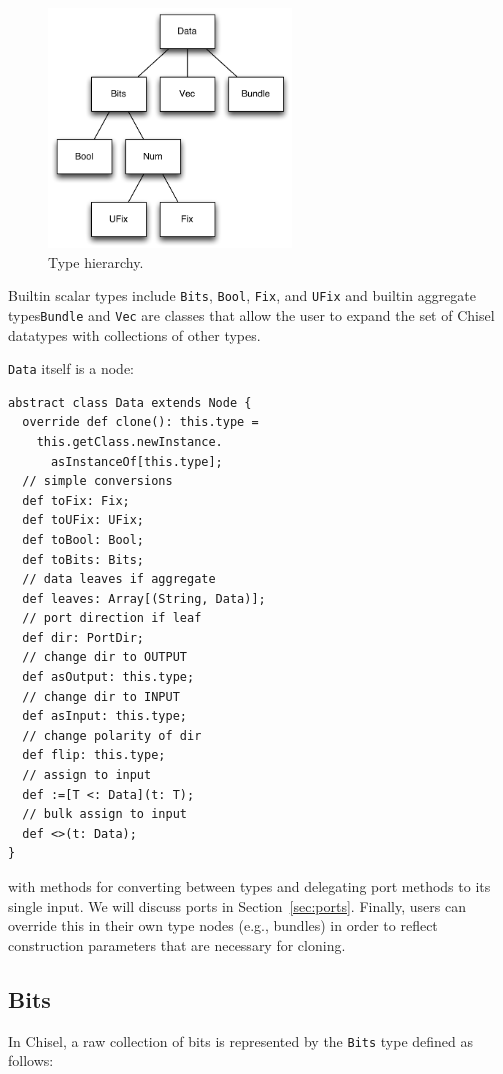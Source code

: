 \documentclass[10pt,twocolumn]{article}
\def\code#1{{\small\tt #1}}
\begin{document}
\begin{figure}[h]
\centering
\includegraphics[height=2.5in]{figs/type-hierarchy.pdf}
\caption{Type hierarchy.}
\label{fig:type-hierarchy}
\end{figure}

\noindent
Builtin scalar types include \code{Bits}, \code{Bool}, \code{Fix}, and
\code{UFix} and builtin aggregate types\code{Bundle} and \code{Vec}
are classes that allow the user to expand
the set of Chisel datatypes with collections of other types.

\code{Data} itself is a node:

\begin{lstlisting}
abstract class Data extends Node {
  override def clone(): this.type =
    this.getClass.newInstance.
      asInstanceOf[this.type];
  // simple conversions
  def toFix: Fix;
  def toUFix: UFix;
  def toBool: Bool;
  def toBits: Bits;
  // data leaves if aggregate
  def leaves: Array[(String, Data)];
  // port direction if leaf
  def dir: PortDir;
  // change dir to OUTPUT
  def asOutput: this.type;
  // change dir to INPUT
  def asInput: this.type;
  // change polarity of dir
  def flip: this.type;
  // assign to input
  def :=[T <: Data](t: T);
  // bulk assign to input
  def <>(t: Data);
}
\end{lstlisting}

\noindent
with methods for converting between types and 
delegating port methods to its single input.   
We will discuss ports in Section~\ref{sec:ports}.
Finally, users can override this in their own type nodes (e.g., bundles) in
order to reflect construction parameters that are necessary for cloning.

\subsection{Bits}

In Chisel, a raw collection of bits is represented by the \code{Bits} type defined as follows:
\end{document}
